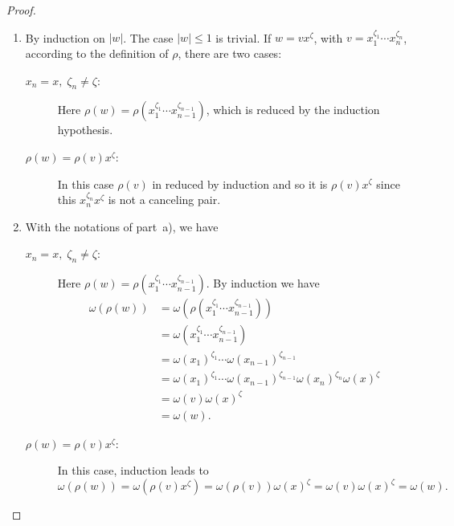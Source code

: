 \begin{proof}${}$
    \begin{enumerate}[\rm a)]
        \item By induction on $|w|$. The case $|w|\le1$ is trivial. If $w=vx^\zeta$, with $v=x_1^{\zeta_1}\cdots x_n^{\zeta_n}$, according to the definition of $\rho$, there are two cases:
        \begin{description}
            \item[\rm\underline{\rm$x_n=x,\;\zeta_n\ne\zeta$}:] Here $\rho(w)=\rho(x_1^{\zeta_1}\cdots x_{n-1}^{\zeta_{n-1}})$, which is reduced by the induction hypothesis.
            
            \item[\rm\underline{$\rho(w)=\rho(v)x^\zeta$}:] In this case $\rho(v)$ in reduced by induction and so it is $\rho(v)x^\zeta$ since this $x_n^{\zeta_n}x^\zeta$ is not a canceling pair.
        \end{description}

        \item With the notations of part~a), we have
        \begin{description}
            \item[\rm\underline{\rm$x_n=x,\;\zeta_n\ne\zeta$}:] Here $\rho(w)=\rho(x_1^{\zeta_1}\cdots x_{n-1}^{\zeta_{n-1}})$. By induction we have
            \begin{align*}
                \omega(\rho(w))
                    &= \omega(\rho(x_1^{\zeta_1}\cdots x_{n-1}^{\zeta_{n-1}}))\\
                    &= \omega(x_1^{\zeta_1}\cdots x_{n-1}^{\zeta_{n-1}})\\
                    &= \omega(x_1)^{\zeta_1}\cdots\omega(x_{n-1})^{\zeta_{n-1}}\\
                    &= \omega(x_1)^{\zeta_1}\cdots\omega(x_{n-1})^{\zeta_{n-1}}
                        \omega(x_n)^{\zeta_n}\omega(x)^\zeta\\
                    &= \omega(v)\omega(x)^\zeta\\
                    &= \omega(w).
            \end{align*}
            
            \item[\rm\underline{$\rho(w)=\rho(v)x^\zeta$}:] In this case, induction leads to
            $$
                \omega(\rho(w))
                    =\omega(\rho(v)x^\zeta)
                    =\omega(\rho(v))\omega(x)^\zeta
                    =\omega(v)\omega(x)^\zeta
                    = \omega(w).
            $$
        \end{description}


\end{enumerate}
\end{proof}
